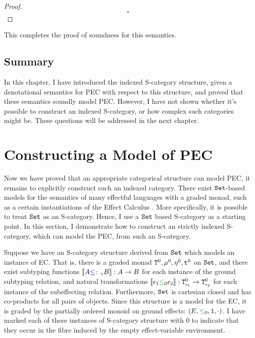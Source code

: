 \documentclass{Report}
\begin{document}
\begin{framed}
\begin{proof}
    
        $$\square$$
    
    \end{proof}
    
\end{framed}

This completes the proof of soundness for this semantics.

\section{Summary}

In this chapter, I have introduced the indexed S-category structure, given a denotational semantics for PEC with respect to this structure, and proved that these semantics soundly model PEC. However, I have not shown whether it's possible to construct an indexed S-category, or how complex such categories might be. These questions will be addressed in the next chapter.

\chapter{Constructing a Model of PEC}

Now we have proved that an appropriate categorical structure can model PEC, it remains to explicitly construct such an indexed category. There exist $\texttt{Set}$-based models for the semantics of many effectful languages with a graded monad, such as a certain instantiations of the Effect Calculus \cite{Katsumata:2014}. More specifically, it is possible to treat $\texttt{Set}$ as an S-category. Hence, I use a $\texttt{Set}$ based S-category as a starting point. In this section, I  demonstrate how to construct an strictly indexed S-category, which can model the PEC, from such an S-category.

Suppose we have an S-category structure derived from $\texttt{Set}$ which models an instance of EC. That is, there is a graded monad $\texttt{T}^0_{}, \mu^0, \eta_{}^0, \texttt{t}^0$ on $\texttt{Set}$, and there exist subtyping functions ${\bf [\![}A{\color{blue} \leq\colon}_\gamma B{\bf ]\!]}: A \rightarrow B$ for each instance of the ground subtyping relation, and natural transformations $\deno{\e_1 \subeffectz \e_2}: \Tz{\e_1}{} \rightarrow \Tz{\e_2}{}$ for each instance of the subeffecting relation. Furthermore, $\texttt{Set}$ is cartesian closed and has co-products for all pairs of objects. Since this structure is a model for the EC, it is graded by the partially ordered monoid on ground effects: $(E, \subeffectz, \1, \dot)$. I have marked each of these instances of S-category structure with $0$ to indicate that they occur in the fibre induced by the empty effect-variable environment.
\end{document}
